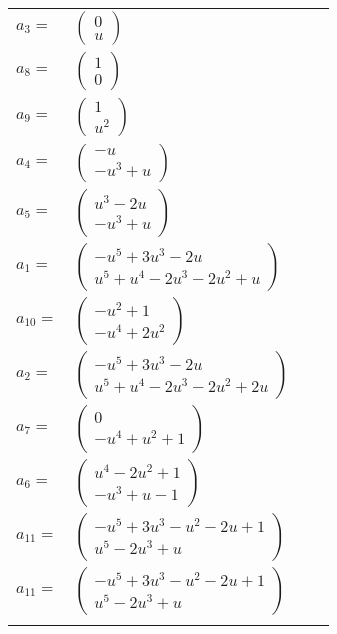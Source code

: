 \documentclass[1p]{elsarticle_modified}
\theoremstyle{definition}
\begin{document}
\begin{tabular}{m{7pt} m{180pt} m{7pt} m{180pt} }
\flushright $a_{3}=$&$\begin{pmatrix}0\\u\end{pmatrix}$ \\
\flushright $a_{8}=$&$\begin{pmatrix}1\\0\end{pmatrix}$ \\
\flushright $a_{9}=$&$\begin{pmatrix}1\\u^2\end{pmatrix}$ \\
\flushright $a_{4}=$&$\begin{pmatrix}- u\\- u^3+u\end{pmatrix}$ \\
\flushright $a_{5}=$&$\begin{pmatrix}u^3-2 u\\- u^3+u\end{pmatrix}$ \\
\flushright $a_{1}=$&$\begin{pmatrix}- u^5+3 u^3-2 u\\u^5+u^4-2 u^3-2 u^2+u\end{pmatrix}$ \\
\flushright $a_{10}=$&$\begin{pmatrix}- u^2+1\\- u^4+2 u^2\end{pmatrix}$ \\
\flushright $a_{2}=$&$\begin{pmatrix}- u^5+3 u^3-2 u\\u^5+u^4-2 u^3-2 u^2+2 u\end{pmatrix}$ \\
\flushright $a_{7}=$&$\begin{pmatrix}0\\- u^4+u^2+1\end{pmatrix}$ \\
\flushright $a_{6}=$&$\begin{pmatrix}u^4-2 u^2+1\\- u^3+u-1\end{pmatrix}$ \\
\flushright $a_{11}=$&$\begin{pmatrix}- u^5+3 u^3- u^2-2 u+1\\u^5-2 u^3+u\end{pmatrix}$\\ \flushright $a_{11}=$&$\begin{pmatrix}- u^5+3 u^3- u^2-2 u+1\\u^5-2 u^3+u\end{pmatrix}$\\&\end{tabular}
\end{document}
